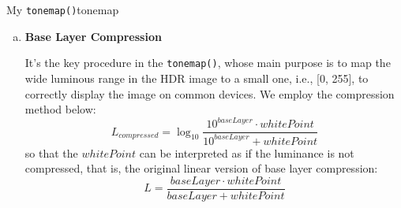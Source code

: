 \begin{problem}{My \texttt{tonemap()}}{tonemap}
\begin{enumerate}[(a)]
        We implemented a \texttt{bilateralFilterDecomposition(I, sigma\_s, sigma\_r)} function to decompose image into base layer and detail layer (\texttt{L = baseLayer + detailLayer}) for subsequent base layer compression. Specific implementation can be found in the file: bilateralFilterDecomposition.mlx.
        \begin{enumerate}[label = (\roman*)]
            \item Generate spacial Gaussian kernel with $3 \times sigma\_s$: 
            \begin{verbatim}
            kernel_radius = ceil(3*sigma_s);
            [X, Y] = meshgrid(-kernel_radius:kernel_radius, 
                    -kernel_radius:kernel_radius);
            spatial_kernel = exp(-(X.^2 + Y.^2)/(2*sigma_s^2));
            \end{verbatim}
            \item Calculate window and luminous kernel for each pixel:
            \begin{verbatim}
            window = I(i_min:i_max, j_min:j_max);
            intensity_diff = window - I(i,j);
            intensity_kernel = exp(-(intensity_diff.^2)/(2*sigma_r^2));
            \end{verbatim}
            \item  Combine weights and normalize:
            \begin{verbatim}
            total_weight = spatial_kernel(
                                (i_min:i_max)-i+kernel_radius+1, 
                                (j_min:j_max)-j+kernel_radius+1) 
                            .* intensity_kernel;
            sum_weight = sum(total_weight(:));
            baseLayer(i,j) = sum(window(:) .* total_weight(:)) 
                            / sum_weight;
            \end{verbatim}
        \end{enumerate}
        
    \item \textbf{Base Layer Compression}

    It's the key procedure in the \texttt{tonemap()}, whose main purpose is to map the wide luminous range in the HDR image to a small one, i.e., [0, 255], to correctly display the image on common devices. We employ the compression method below:
    $$L_{compressed} = \log_{10}{\frac{10^{baseLayer} \cdot {whitePoint}}{10^{baseLayer} + {whitePoint}}}$$
    so that the $whitePoint$ can be interpreted as if the luminance is not compressed, that is, the original linear version of base layer compression:
    $$L = \frac{baseLayer \cdot whitePoint}{baseLayer + whitePoint}$$


\end{enumerate}
\end{problem}
